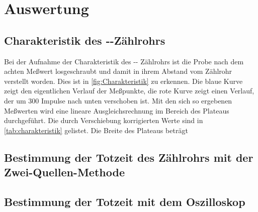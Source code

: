 
\section{Auswertung}

\subsection{Charakteristik des --Zählrohrs}

Bei der Aufnahme der Charakteristik des --
Zählrohrs ist die Probe nach dem achten Meßwert losgeschraubt und damit
in ihrem Abstand vom Zählrohr verstellt worden. Dies ist in
\cref{fig:Charakteristik} zu erkennen. Die blaue Kurve zeigt den
eigentlichen Verlauf der Meßpunkte, die rote Kurve zeigt einen Verlauf,
der um 300 Impulse nach unten verschoben ist. Mit den sich so ergebenen
Meßwerten wird eine lineare Ausgleichsrechnung im Bereich des Plateaus
durchgeführt. Die durch Verschiebung korrigierten Werte sind in
\cref{tab:charakteristik} gelistet. Die Breite des Plateaus beträgt 



\subsection{Bestimmung der Totzeit des Zählrohrs mit der
  Zwei-Quellen-Methode}

\subsection{Bestimmung der Totzeit mit dem Oszilloskop}

